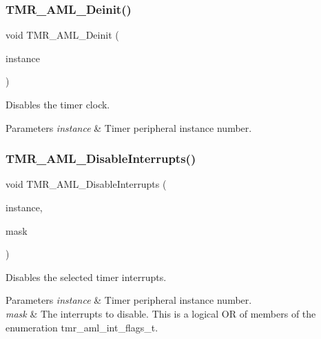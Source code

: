\subsubsection{\texorpdfstring{TMR\_AML\_Deinit()}{TMR\_AML\_Deinit()}}
{\footnotesize\ttfamily void T\+M\+R\+\_\+\+A\+M\+L\+\_\+\+Deinit (\begin{DoxyParamCaption}\item[{\mbox{\hyperlink{common__aml_8h_a562bd37c7d07adcedec5993bc0cd96e5}{aml\+\_\+instance\+\_\+t}}}]{instance }\end{DoxyParamCaption})}



Disables the timer clock. 


\begin{DoxyParams}{Parameters}
{\em instance} & Timer peripheral instance number. \\
\hline
\end{DoxyParams}
\mbox{\label{group__function__group_ga068c940f493532d19a7de4bf42264be7}} 
\subsubsection{\texorpdfstring{TMR\_AML\_DisableInterrupts()}{TMR\_AML\_DisableInterrupts()}}
{\footnotesize\ttfamily void T\+M\+R\+\_\+\+A\+M\+L\+\_\+\+Disable\+Interrupts (\begin{DoxyParamCaption}\item[{\mbox{\hyperlink{common__aml_8h_a562bd37c7d07adcedec5993bc0cd96e5}{aml\+\_\+instance\+\_\+t}}}]{instance,  }\item[{uint16\+\_\+t}]{mask }\end{DoxyParamCaption})}



Disables the selected timer interrupts. 


\begin{DoxyParams}{Parameters}
{\em instance} & Timer peripheral instance number. \\
\hline
{\em mask} & The interrupts to disable. This is a logical OR of members of the enumeration tmr\+\_\+aml\+\_\+int\+\_\+flags\+\_\+t. \\
\hline
\end{DoxyParams}
\mbox{\label{group__function__group_ga9ca82949c9aa24058f89d44b6e5ce44f}} 
